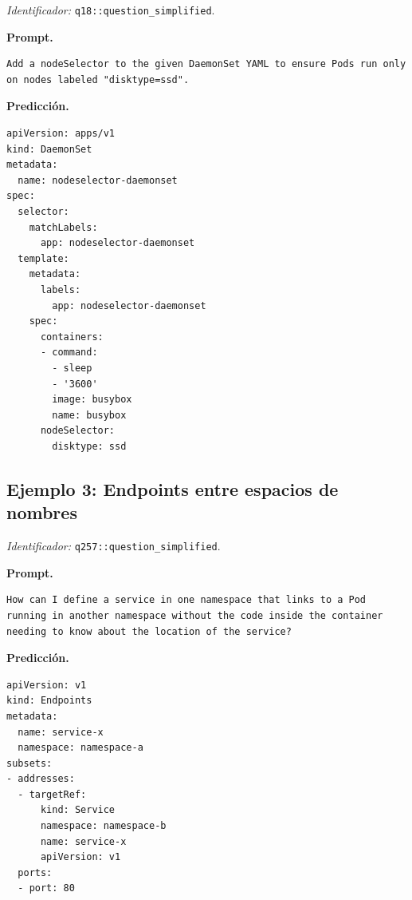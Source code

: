 \noindent\textit{Identificador:} \texttt{q18::question\_simplified}.

\noindent\textbf{Prompt.}
\begin{lstlisting}[style=yamlblock]
Add a nodeSelector to the given DaemonSet YAML to ensure Pods run only on nodes labeled "disktype=ssd".
\end{lstlisting}

\noindent\textbf{Predicción.}
\begin{lstlisting}[style=yamlblock]
apiVersion: apps/v1
kind: DaemonSet
metadata:
  name: nodeselector-daemonset
spec:
  selector:
    matchLabels:
      app: nodeselector-daemonset
  template:
    metadata:
      labels:
        app: nodeselector-daemonset
    spec:
      containers:
      - command:
        - sleep
        - '3600'
        image: busybox
        name: busybox
      nodeSelector:
        disktype: ssd
\end{lstlisting}

\subsection*{Ejemplo 3: Endpoints entre espacios de nombres}

\noindent\textit{Identificador:} \texttt{q257::question\_simplified}.

\noindent\textbf{Prompt.}
\begin{lstlisting}[style=yamlblock]
How can I define a service in one namespace that links to a Pod running in another namespace without the code inside the container needing to know about the location of the service?
\end{lstlisting}

\noindent\textbf{Predicción.}
\begin{lstlisting}[style=yamlblock]
apiVersion: v1
kind: Endpoints
metadata:
  name: service-x
  namespace: namespace-a
subsets:
- addresses:
  - targetRef:
      kind: Service
      namespace: namespace-b
      name: service-x
      apiVersion: v1
  ports:
  - port: 80
\end{lstlisting}
